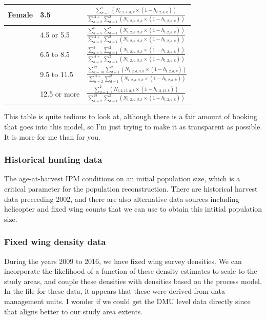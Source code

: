 \documentclass[12pt]{article}\usepackage[]{graphicx}\usepackage[]{color}
\begin{document}
\begin{center}
\begin{table}[H]
\begin{tabular}{lll}
Female  & 3.5 & $\frac{\sum_{d=1}^2 \left(N_{t,2,4,d,k}\times(1-h_{t,2,4,k})\right)}{\sum_{a=2}^{A+}\sum_{d=1}^2 \left(N_{t,2,a,d,k}\times(1-h_{t,2,a,k})\right)}$\\\midrule
  & 4.5 or 5.5& $\frac{\sum_{a=5}^{6}\sum_{d=1}^2 \left(N_{t,2,a,d,k}\times(1-h_{t,2,a,k})\right)}{\sum_{a=2}^{A+}\sum_{d=1}^2 \left(N_{t,2,a,d,k}\times(1-h_{t,2,a,k})\right)}$\\\midrule
  & 6.5 to 8.5&  $\frac{\sum_{a=7}^{9}\sum_{d=1}^2 \left(N_{t,2,a,d,k}\times(1-h_{t,2,a,k})\right)}{\sum_{a=2}^{A+}\sum_{d=1}^2 \left(N_{t,2,a,d,k}\times(1-h_{t,2,a,k})\right)}$\\\midrule
  & 9.5 to 11.5 & $\frac{\sum_{a=10}^{12}\sum_{d=1}^2 \left(N_{t,2,a,d,k}\times(1-h_{t,2,a,k})\right)}{\sum_{a=2}^{A+}\sum_{d=1}^2 \left(N_{t,2,a,d,k}\times(1-h_{t,2,a,k})\right)}$\\\midrule
  & 12.5 or more& $\frac{\sum_{d=1}^2 \left(N_{t,2,13,d,k}\times(1-h_{t,2,13,k})\right)}{\sum_{a=2}^{13}\sum_{d=1}^2 \left(N_{t,2,a,d,k}\times(1-h_{t,2,a,k})\right)}$\\
  \bottomrule
\end{tabular}
\end{table}
\end{center}

\noindent This table is quite tedious to look at, although there is a fair amount of booking that goes into this model, so I'm just trying to make it as transparent as possible. It is more for me than for you.

\subsubsection{Historical hunting data}
The age-at-harvest IPM conditions on an initial population size, which is a critical parameter for the population reconstruction. There are historical harvest data preceeding 2002, and there are also alternative data sources including helicopter and fixed wing counts that we can use to obtain this intitial population size. 

\subsubsection{Fixed wing density data}

During the years 2009 to 2016, we have fixed wing survey densities. We can incorporate the likelihood of a function of these density estimates to scale to the study areas, and couple these densities with densities based on the process model. In the file for these data, it appears that these were derived from data management units. I wonder if we could get the DMU level data directly since that aligns better to our study area extents.
\end{document}
